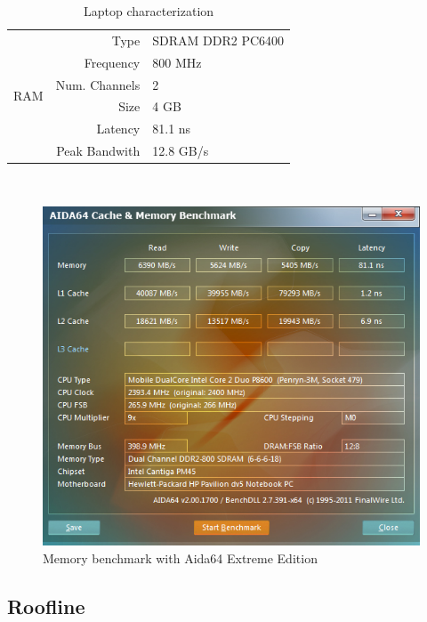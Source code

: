 \begin{table}[!htp]
\begin{minipage}[t]{0.5\linewidth}
\begin{tabular}{|c|rl|}
			\multicolumn{1}{|c|}{\multirow{6}{*}{RAM}}
				&	Type			&	SDRAM DDR2 PC6400				\\
				&	Frequency		&	800 MHz							\\
				&	Num. Channels	&	2								\\
				&	Size			&	4 GB							\\
				&	Latency			&	81.1 ns							\\
				&	Peak Bandwith	&	12.8 GB/s						\\
			\hline			
		\end{tabular}
\end{minipage}
	\caption{Laptop characterization \label{tab:profile}}
\end{table}
~

\begin{figure}[!htp]
	\begin{center}
		\includegraphics[width=12cm]{images/aida64.png}
		\caption[Memory benchmark]{Memory benchmark with Aida64 Extreme Edition \label{fig:aida64}}
	\end{center}
\end{figure}

\subsection{Roofline}

